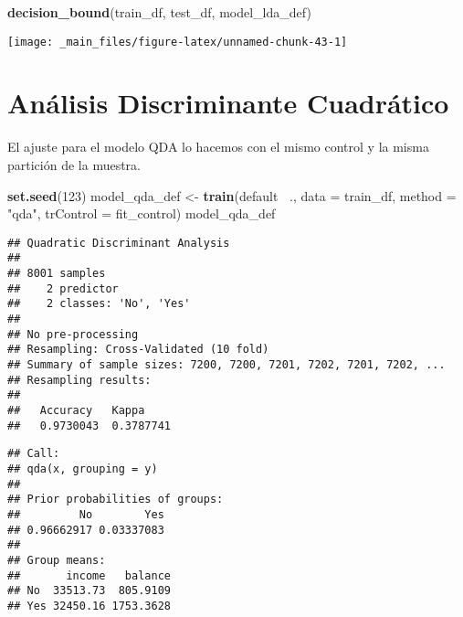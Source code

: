 \documentclass[]{book}
\newenvironment{Shaded}{\begin{snugshade}}{\end{snugshade}}
\newcommand{\DataTypeTok}[1]{\textcolor[rgb]{0.13,0.29,0.53}{#1}}
\newcommand{\DecValTok}[1]{\textcolor[rgb]{0.00,0.00,0.81}{#1}}
\newcommand{\KeywordTok}[1]{\textcolor[rgb]{0.13,0.29,0.53}{\textbf{#1}}}
\newcommand{\NormalTok}[1]{#1}
\newcommand{\OperatorTok}[1]{\textcolor[rgb]{0.81,0.36,0.00}{\textbf{#1}}}
\newcommand{\StringTok}[1]{\textcolor[rgb]{0.31,0.60,0.02}{#1}}
\begin{document}
\begin{Shaded}
\begin{Highlighting}[]
\KeywordTok{decision_bound}\NormalTok{(train_df, test_df, model_lda_def)}
\end{Highlighting}
\end{Shaded}

\begin{center}\texttt{[image: \_main\_files/figure-latex/unnamed-chunk-43-1]} \end{center}

\hypertarget{QDA}{%
\section{Análisis Discriminante Cuadrático}\label{QDA}}

El ajuste para el modelo QDA lo hacemos con el mismo control y la misma partición de la muestra.

\begin{Shaded}
\begin{Highlighting}[]
\KeywordTok{set.seed}\NormalTok{(}\DecValTok{123}\NormalTok{)}
\NormalTok{model_qda_def <-}\StringTok{ }\KeywordTok{train}\NormalTok{(default }\OperatorTok{~}\NormalTok{.,}
                       \DataTypeTok{data =}\NormalTok{ train_df,}
                       \DataTypeTok{method =} \StringTok{"qda"}\NormalTok{,}
                       \DataTypeTok{trControl =}\NormalTok{ fit_control)}
\NormalTok{model_qda_def}
\end{Highlighting}
\end{Shaded}

\begin{verbatim}
## Quadratic Discriminant Analysis 
## 
## 8001 samples
##    2 predictor
##    2 classes: 'No', 'Yes' 
## 
## No pre-processing
## Resampling: Cross-Validated (10 fold) 
## Summary of sample sizes: 7200, 7200, 7201, 7202, 7201, 7202, ... 
## Resampling results:
## 
##   Accuracy   Kappa    
##   0.9730043  0.3787741
\end{verbatim}

\begin{Shaded}
\end{Shaded}

\begin{verbatim}
## Call:
## qda(x, grouping = y)
## 
## Prior probabilities of groups:
##         No        Yes 
## 0.96662917 0.03337083 
## 
## Group means:
##       income   balance
## No  33513.73  805.9109
## Yes 32450.16 1753.3628
\end{verbatim}
\end{document}
